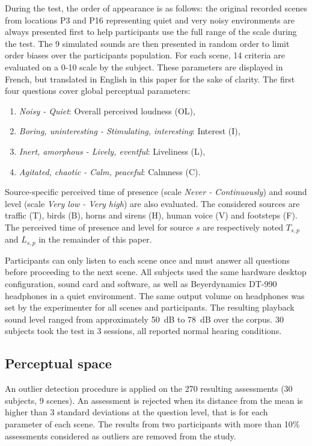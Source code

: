 \documentclass{article}
\begin{document}
\begin{sloppy}
During the test, the order of appearance is as follows: the original recorded scenes from locations P3 and P16 representing quiet and very noisy environments are always presented first to help participants use the full range of the scale during the test. The 9 simulated sounds are then presented in random order to limit order biases over the participants population. For each scene, 14 criteria are evaluated on a 0-10 scale by the subject. These parameters are displayed in French, but translated in English in this paper for the sake of clarity. The first four questions cover global perceptual parameters:
\begin{enumerate}
\item \textit{Noisy - Quiet}: Overall perceived loudness (OL),
\item \textit{Boring, uninteresting - Stimulating, interesting}: Interest (I),
\item \textit{Inert, amorphous - Lively, eventful}: Liveliness (L),
\item \textit{Agitated, chaotic - Calm, peaceful}: Calmness (C).
\end{enumerate}
Source-specific perceived time of presence (scale \textit{Never - Continuously}) and sound level (scale \textit{Very low - Very high}) are also evaluated. The considered sources are traffic (T), birds (B), horns and sirens (H), human voice (V) and footsteps (F). The perceived time of presence and level for source $s$ are respectively noted $T_{s,p}$ and $L_{s,p}$ in the remainder of this paper.

Participants can only listen to each scene once and must answer all questions before proceeding to the next scene. All subjects used the same hardware desktop configuration, sound card and software, as well as Beyerdynamics DT-990 headphones in a quiet environment. The same output volume on headphones was set by the experimenter for all scenes and participants. The resulting playback sound level ranged from approximately 50~dB to 78~dB over the corpus. 30 subjects took the test in 3 sessions, all reported normal hearing conditions.

\subsection{Perceptual space}


An outlier detection procedure is applied on the 270 resulting assessments (30 subjects, 9 scenes). An assessment is rejected when its distance from the mean is higher than 3 standard deviations at the question level, that is for each parameter of each scene. The results from two participants with more than 10\% assessments considered as outliers are removed from the study.


\end{sloppy}
\end{document}
